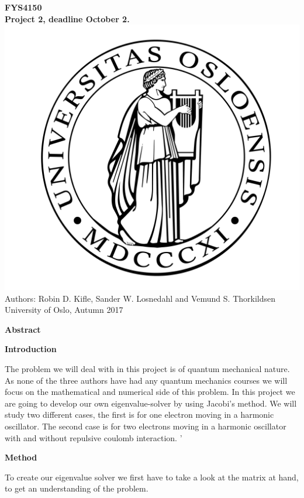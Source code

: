 \documentclass[10pt,a4paper]{article}
\begin{document}
\begin{center}
{\LARGE\bf
FYS4150\\
Project 2, deadline October 2.
}
 \includegraphics[scale=0.1]{uio.png}\\
Authors: Robin D. Kifle, Sander W. Losnedahl and Vemund S. Thorkildsen\\
University of Oslo, Autumn 2017

{\LARGE\bf Abstract}
\end{center}
\newpage

\begin{center}
{\LARGE\bf Introduction}
\end{center}
The problem we will deal with in this project is of quantum mechanical nature. As none of the three authors have had any quantum mechanics courses we will focus on the mathematical and numerical side of this problem. In this project we are going to develop our own eigenvalue-solver by using Jacobi's method. We will study two different cases, the first is for one electron moving in a harmonic oscillator. The second case is for two electrons moving in a harmonic oscillator with and without repulsive coulomb interaction.
\newpage'

\begin{center}
{\LARGE\bf Method}
\end{center}
To create our eigenvalue solver we first have to take a look at the matrix at hand, to get an understanding of the problem.
\end{document}
